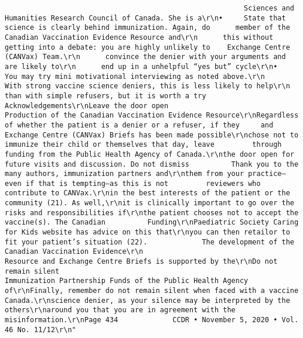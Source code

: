 \documentclass[
]{book}
\begin{document}
\begin{verbatim}
                                                         Sciences and Humanities Research Council of Canada. She is a\r\n•     State that science is clearly behind immunization. Again, do      member of the Canadian Vaccination Evidence Resource and\r\n      this without getting into a debate: you are highly unlikely to    Exchange Centre (CANVax) Team.\r\n      convince the denier with your arguments and are likely to\r\n      end up in a unhelpful “yes but” cycle\r\n•     You may try mini motivational interviewing as noted above.\r\n      With strong vaccine science deniers, this is less likely to help\r\n      than with simple refusers, but it is worth a try                  Acknowledgements\r\nLeave the door open                                                     Production of the Canadian Vaccination Evidence Resource\r\nRegardless of whether the patient is a denier or a refuser, if they     and Exchange Centre (CANVax) Briefs has been made possible\r\nchose not to immunize their child or themselves that day, leave         through funding from the Public Health Agency of Canada.\r\nthe door open for future visits and discussion. Do not dismiss          Thank you to the many authors, immunization partners and\r\nthem from your practice—even if that is tempting—as this is not         reviewers who contribute to CANVax.\r\nin the best interests of the patient or the community (21). As well,\r\nit is clinically important to go over the risks and responsibilities if\r\nthe patient chooses not to accept the vaccine(s). The Canadian          Funding\r\nPaediatric Society Caring for Kids website has advice on this that\r\nyou can then retailor to fit your patient’s situation (22).             The development of the Canadian Vaccination Evidence\r\n                                                                        Resource and Exchange Centre Briefs is supported by the\r\nDo not remain silent                                                    Immunization Partnership Funds of the Public Health Agency of\r\nFinally, remember do not remain silent when faced with a vaccine        Canada.\r\nscience denier, as your silence may be interpreted by the others\r\naround you that you are in agreement with the misinformation.\r\nPage 434             CCDR • November 5, 2020 • Vol. 46 No. 11/12\r\n"                                                                                                                                                                                                                                                                                                                                                                                                                                                                

\end{verbatim}
\end{document}
